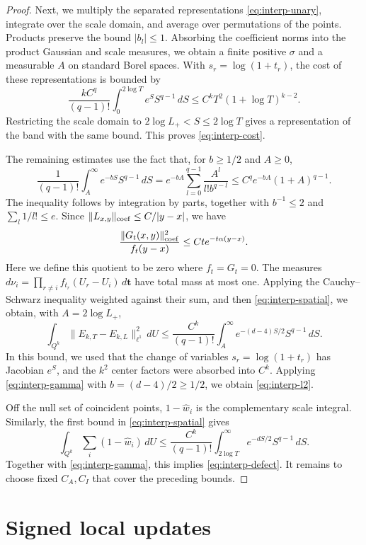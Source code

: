 \begin{proof}
Next, we multiply the separated representations
\eqref{eq:interp-unary}, integrate over the scale domain, and average
over permutations of the points. Products preserve the bound
$|b_l|\le1$. Absorbing the coefficient norms into the product Gaussian
and scale measures, we obtain a finite positive $\sigma$ and a
measurable $A$ on standard Borel spaces. With $s_r=\log(1+t_r)$, the
cost of these representations is bounded by
\begin{equation}\label{eq:interp-separated-cost}
 \frac{kC^q}{(q-1)!}\int_0^{2\log T}e^S S^{q-1}\,dS
 \le C^kT^2(1+\log T)^{k-2}.
\end{equation}
Restricting the scale domain to $2\log L_+<S\le2\log T$ gives a
representation of the band with the same bound. This proves
\eqref{eq:interp-cost}.

The remaining estimates use the fact that, for $b\ge1/2$ and
$A\ge0$,
\begin{equation}\label{eq:interp-gamma}
 \frac1{(q-1)!}\int_A^\infty e^{-bS}S^{q-1}\,dS
 =e^{-bA}\sum_{l=0}^{q-1}\frac{A^l}{l!b^{q-l}}
 \le C^q e^{-bA}(1+A)^{q-1}.
\end{equation}
The inequality follows by integration by parts, together with
$b^{-1}\le2$ and $\sum_l1/l!\le e$. Since
$\|L_{x,y}\|_{\rm coef}\le C/|y-x|$, we have
\[
 \frac{\|G_t(x,y)\|_{\rm coef}^2}{f_t(y-x)}
 \le Ct e^{-t\alpha(y-x)}.
\]
Here we define this quotient to be zero where $f_t=G_t=0$.
The measures
$d\nu_i=\prod_{r\ne i}f_{t_r}(U_r-U_i)\,d\boldsymbol t$
have total mass at most one. Applying the Cauchy--Schwarz inequality
weighted against their sum, and then \eqref{eq:interp-spatial}, we
obtain, with $A=2\log L_+$,
\[
 \int_{Q^k}\|E_{k,T}-E_{k,L}\|_{\ell^1}^2\,dU
 \le\frac{C^k}{(q-1)!}
      \int_A^\infty e^{-(d-4)S/2}S^{q-1}\,dS.
\]
In this bound, we used that the change of variables
$s_r=\log(1+t_r)$ has Jacobian $e^S$, and the $k^2$ center factors
were absorbed into $C^k$. Applying \eqref{eq:interp-gamma} with
$b=(d-4)/2\ge1/2$, we obtain \eqref{eq:interp-l2}.

Off the null set of coincident points, $1-\widehat w_i$ is the
complementary scale integral. Similarly, the first bound in
\eqref{eq:interp-spatial} gives
\[
 \int_{Q^k}\sum_i(1-\widehat w_i)\,dU
 \le\frac{C^k}{(q-1)!}
 \int_{2\log T}^\infty e^{-dS/2}S^{q-1}\,dS.
\]
Together with \eqref{eq:interp-gamma}, this implies
\eqref{eq:interp-defect}. It remains to choose fixed $C_A,C_I$ that
cover the preceding bounds.
\end{proof}
\section{Signed local updates}\label{sec:LB-local}


